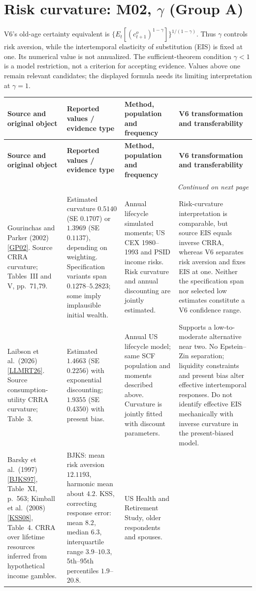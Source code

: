 \documentclass[10pt,a4paper,landscape]{article}
\makeatletter
\newcommand{\src}[1]{\hyperlink{ref:#1}{\textsf{[#1]}}}
\newenvironment{evidence}{%
\fontsize{9.4}{10.9}\selectfont\setlength{\parskip}{2pt}
\begin{longtable}{@{}P{\dimexpr .22\textwidth-7.5pt\relax}P{\dimexpr .24\textwidth-7.5pt\relax}P{\dimexpr .25\textwidth-7.5pt\relax}P{\dimexpr .29\textwidth-7.5pt\relax}@{}}
\toprule\rowcolor{tablehead}\textbf{Source and original object} & \textbf{Reported values / evidence type} & \textbf{Method, population and frequency} & \textbf{V6 transformation and transferability}\\\midrule
\endfirsthead
\toprule\rowcolor{tablehead}\textbf{Source and original object} & \textbf{Reported values / evidence type} & \textbf{Method, population and frequency} & \textbf{V6 transformation and transferability}\\\midrule
\endhead
\midrule\multicolumn{4}{r}{\footnotesize\itshape Continued on next page}\\\endfoot
\bottomrule\endlastfoot
}{\end{longtable}}
\makeatother
\begin{document}
\clearpage
\section[Risk curvature: M02, gamma (Group A)]{Risk curvature: M02, $\gamma$ (Group A)}

V6's old-age certainty equivalent is
$\{E_t[(c_{t+1}^o)^{1-\gamma}]\}^{1/(1-\gamma)}$.
Thus $\gamma$ controls risk aversion, while the intertemporal elasticity of
substitution (EIS) is fixed at one. Its numerical value is not annualized.
The sufficient-theorem condition $\gamma<1$ is a model restriction, not a
criterion for accepting evidence. Values above one remain relevant candidates;
the displayed formula needs its limiting interpretation at $\gamma=1$.

\begin{evidence}
Gourinchas and Parker (2002) \src{GP02}.
Source CRRA curvature; Tables~III and V, pp.~71,79.
&
Estimated curvature $0.5140$ (SE $0.1707$) or $1.3969$ (SE $0.1137$), depending
on weighting. Specification variants span $0.1278$--$5.2823$; some imply
implausible initial wealth.
&
Annual lifecycle simulated moments; US CEX 1980--1993 and PSID income risks.
Risk curvature and annual discounting are jointly estimated.
&
Risk-curvature interpretation is comparable, but source EIS equals inverse
CRRA, whereas V6 separates risk aversion and fixes EIS at one. Neither the
specification span nor selected low estimates constitute a V6 confidence range.
\\[5pt]
Laibson et al.\ (2026) \src{LLMRT26}.
Source consumption-utility CRRA curvature; Table~3.
&
Estimated $1.4663$ (SE $0.2256$) with exponential discounting;
$1.9355$ (SE $0.4350$) with present bias.
&
Annual US lifecycle model; same SCF population and moments described above.
Curvature is jointly fitted with discount parameters.
&
Supports a low-to-moderate alternative near two. No Epstein--Zin separation;
liquidity constraints and present bias alter effective intertemporal responses.
Do not identify effective EIS mechanically with inverse curvature in the
present-biased model.
\\[5pt]
Barsky et al.\ (1997) \src{BJKS97}, Table~XI, p.~563;
Kimball et al.\ (2008) \src{KSS08}, Table~4.
CRRA over lifetime resources inferred from hypothetical income gambles.
&
BJKS: mean risk aversion $12.1193$, harmonic mean about $4.2$.
KSS, correcting response error: mean $8.2$, median $6.3$, interquartile range
$3.9$--$10.3$, 5th--95th percentiles $1.9$--$20.8$.
&
US Health and Retirement Study, older respondents and spouses.

\end{evidence}
\end{document}

